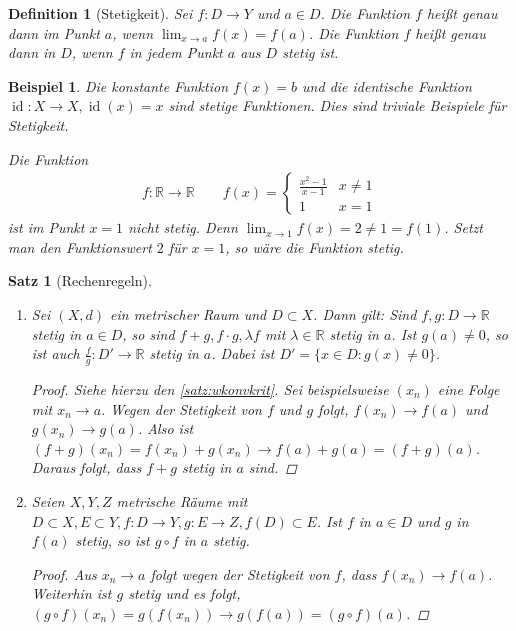 \documentclass[ngerman,titlepage,twoside, parskip=half*]{scrreprt}
\newcommand*{\R}{\mathbb{R}}
\theoremstyle{break}
\newtheorem{theorem}{Satz}[section]
\newtheorem{definition}{Definition}[chapter]
\theoremstyle{nonumberbreak}
\newtheorem{beispiel}{Beispiel}
\newtheorem{proof}{Beweis:}
\newcommand*{\highl}[2][]{\textbf{\boldmath{#2}}%
  \ifthenelse{\equal{#1}{}}{\index{#2}}{\index{#1}}%
}
\DeclareMathOperator{\id}{id}
\begin{document}
\begin{definition}[Stetigkeit]
Sei $f\colon D\rightarrow Y$ und $a \in D$. Die Funktion $f$ heißt genau dann
  \highl{stetig} im Punkt $a$, wenn $\lim_{x\rightarrow a}
  f(x)=f(a)$. Die Funktion $f$ heißt genau dann
  \highl{stetig} in $D$, wenn $f$ in jedem Punkt
  $a$ aus $D$ stetig ist.
\end{definition}

\begin{beispiel}
  Die konstante Funktion $f(x)=b$ und die identische Funktion $\id\colon
  X\rightarrow X, \id(x)=x$ sind stetige Funktionen. Dies sind triviale
  Beispiele für Stetigkeit.

  Die Funktion
  \begin{gather*}
    f\colon\R\rightarrow \R\qquad f(x)=\begin{cases}\frac{x^2-1}{x-1} & x \neq
					 1\\1 & x=1\end{cases}
  \end{gather*}
  ist im Punkt $x=1$ \emph{nicht} stetig. Denn $\lim_{x\rightarrow 1}f(x)=2\neq
  1=f(1)$. Setzt man den Funktionswert $2$ für $x=1$, so wäre die Funktion
  stetig.
\end{beispiel}

\begin{theorem}[Rechenregeln]
\begin{enumerate}[(1)]
  \item Sei $(X,d)$ ein metrischer Raum und $D \subset X$. Dann gilt: Sind
  $f,g\colon D\rightarrow\R$ stetig in $a \in D$, so sind $f+g, f\cdot g,
  \lambda f$ mit $\lambda \in \R$ stetig in $a$. Ist $g(a)\neq 0$, so ist auch
  $\frac{f}{g}\colon D'\rightarrow \R$ stetig in $a$. Dabei ist $D'=\{x\in
  D\colon g(x)\neq 0\}$.
  \begin{proof}
    Siehe hierzu den \autoref{satz:wkonvkrit}. Sei beispielsweise $(x_n)$ eine
    Folge mit $x_n\rightarrow a$. Wegen der Stetigkeit von $f$ und $g$ folgt,
    $f(x_n)\rightarrow f(a)$ und $g(x_n)\rightarrow g(a)$. Also ist
    $(f+g)(x_n)=f(x_n)+g(x_n)\rightarrow f(a)+g(a)=(f+g)(a)$.
    Daraus folgt, dass $f+g$ stetig in $a$ sind.
  \end{proof}
  \item Seien $X,Y,Z$ metrische Räume mit $D\subset X, E\subset Y, f\colon
  D\rightarrow Y, g\colon E\rightarrow Z, f(D)\subset E$. Ist $f$ in $a\in D$
  und $g$ in $f(a)$ stetig, so ist $g\circ f$ in $a$ stetig.
  \begin{proof}
    Aus $x_n\rightarrow a$ folgt wegen der Stetigkeit von $f$, dass
    $f(x_n)\rightarrow f(a)$. Weiterhin ist $g$ stetig und es folgt, $(g \circ
    f)(x_n)=g(f(x_n))\rightarrow g(f(a))=(g\circ f) (a)$.
  \end{proof}
\end{enumerate}
\end{theorem}
\end{document}
